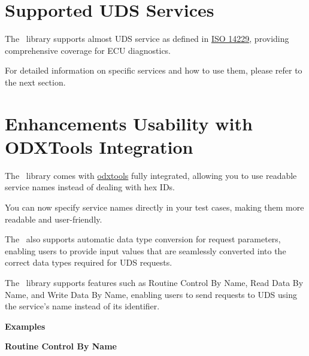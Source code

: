 \section{Supported UDS Services}
The \pkg\ library supports almost UDS service as defined in 
\href{https://automotive.wiki/index.php/ISO_14229}{ISO 14229}, 
providing comprehensive coverage for ECU diagnostics.

For detailed information on specific services and how to use them, please refer 
to the next section.

\section{Enhancements Usability with ODXTools Integration}
The \pkg\ library comes with 
\href{https://github.com/mercedes-benz/odxtools}{odxtools} fully integrated, 
allowing you to use readable service names instead of dealing with hex IDs.

You can now specify service names directly in your test cases, 
making them more readable and user-friendly.

The \pkg\ also supports automatic data type conversion for request parameters, 
enabling users to provide input values that are seamlessly converted into the 
correct data types required for UDS requests.

The \pkg\ library supports features such as Routine Control By Name, 
Read Data By Name, and Write Data By Name, enabling users to send requests to 
UDS using the service's name instead of its identifier.

{\large\textbf{Examples}}

\textbf{Routine Control By Name}

